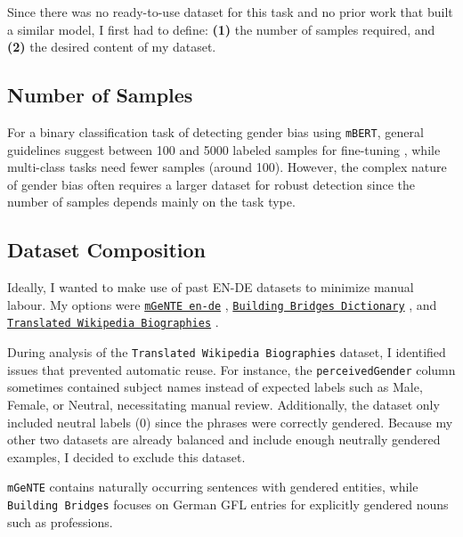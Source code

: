 Since there was no ready-to-use dataset for this task and no prior work that built a similar model, I first had to define: \textbf{(1)} the number of samples required,  and \textbf{(2)} the desired content of my dataset.

\subsection{Number of Samples}
For a binary classification task of detecting gender bias using \texttt{mBERT}, general guidelines suggest between 100 and 5000 labeled samples for fine-tuning \parencite{pecherComparingSpecialisedSmall2024}, while multi-class tasks need fewer samples (around 100). However, the complex nature of gender bias often requires a larger dataset for robust detection since the number of samples depends mainly on the task type. 

\subsection{Dataset Composition}
Ideally, I wanted to make use of past EN-DE datasets to minimize manual labour. My options were \texttt{\href{https://huggingface.co/datasets/FBK-MT/mGeNTE}{mGeNTE en-de}} \parencite{savoldiMGeNTEMultilingualResource2025}, \texttt{\href{https://github.com/g8a9/building-bridges-gender-fair-german-mt}{Building Bridges Dictionary}} \parencite{lardelliBuildingBridgesDataset2024}, and \texttt{\href{https://research.google/blog/a-dataset-for-studying-gender-bias-in-translation/}{Translated Wikipedia Biographies}} \parencite{stellaDatasetStudyingGender2021}. 

During analysis of the \texttt{Translated Wikipedia Biographies} dataset, I identified issues that prevented automatic reuse. For instance, the \texttt{perceivedGender} column sometimes contained subject names instead of expected labels such as Male, Female, or Neutral, necessitating manual review. Additionally, the dataset only included neutral labels (0) since the phrases were correctly gendered. Because my other two datasets are already balanced and include enough neutrally gendered examples, I decided to exclude this dataset.

\texttt{mGeNTE} contains naturally occurring sentences with gendered entities, while \texttt{Building Bridges} focuses on German GFL entries for explicitly gendered nouns such as professions. 

